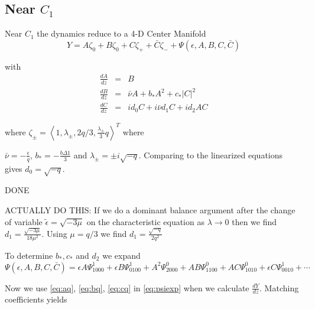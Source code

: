 \subsection{ Near $C_1$ }
Near $C_1$ the dynamics reduce to a 4-D Center Manifold
\begin{equation} Y = A \zeta_0 + B \zeta_0 + C \zeta_+ + \bar{C} \zeta_- + \Psi(\epsilon,A,B,C,\bar{C})
\end{equation}

with 
\begin{subequations}
\begin{eqnarray}
\frac{dA}{dz} &=& B \\ \label{eq:aq}
\frac{dB}{dz} &=& \bar{\nu} A + b_* A^2 + c_* \left|C\right|^2 \\ \label{eq:bq}
\frac{dC}{dz} &=& i d_0 C + i \bar{\nu} d_1 C + i d_2 A C \label{eq:cq}
\end{eqnarray}
\end{subequations}

where  $\zeta_\pm = \left< 1, \lambda_\pm, 2 q / 3, \frac{\lambda_\pm}{3} q\right>^T$ where 

$\bar{\nu} = -\frac{\epsilon}{q}$, $b_* = -\frac{b \Delta1}{3}$  and $\lambda_\pm = \pm i \sqrt{-q} $. Comparing to the linearized equations gives $d_0 = \sqrt{-q} $.

DONE

ACTUALLY DO THIS: If we do a dominant balance argument after the change of variable $\tilde{\epsilon} = \sqrt{-3 \mu}$ on the characteristic equation as $\lambda \rightarrow 0 $ then we find $d_1 = \frac{ \sqrt{-3 \mu} }{18 \mu^2 } $. Using $\mu=q/3$ we find $d_1 = \frac{\sqrt{-q}}{2 q^2} $ 

To determine $b_*,c_*$ and $d_2$ we expand 
\begin{equation}\label{eq:psiexp}
\Psi(\epsilon,A,B,C,\bar{C}) = \epsilon A \Psi_{1000}^1 + \epsilon B \Psi_{0100}^1 + A^2 \Psi_{2000}^0 + A B \Psi_{1100}^0 + A C \Psi_{1010}^0 + \epsilon C \Psi_{0010}^1 + \cdots 
\end{equation}

Now we use \eqref{eq:aq}, \eqref{eq:bq}, \eqref{eq:cq} in  \eqref{eq:psiexp} when we calculate $\frac{dY}{dz}$. Matching coefficients yields


